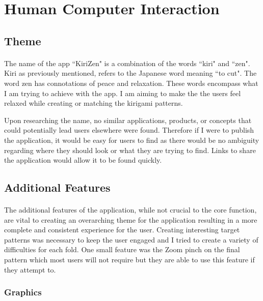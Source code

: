 \documentclass[11pt]{article}
\begin{document}
\clearpage
\newpage
\section{Human Computer Interaction}
    
    \subsection{Theme}
        
        \paragraph{}
        The name of the app ``KiriZen" is a combination of the words ``kiri" and ``zen". Kiri as previously mentioned, refers to the Japanese word meaning ``to cut". The word zen has connotations of peace and relaxation. These words encompass what I am trying to achieve with the app. I am aiming to make the the users feel relaxed while creating or matching the kirigami patterns.
        
        Upon researching the name, no similar applications, products, or concepts that could potentially lead users elsewhere were found. Therefore if I were to publish the application, it would be easy for users to find as there would be no ambiguity regarding where they should look or what they are trying to find. Links to share the application would allow it to be found quickly. 

        \subsection{Additional Features}
            \paragraph{}
        The additional features of the application, while not crucial to the core function, are vital to creating an overarching theme for the application resulting in a more complete and consistent experience for the user. Creating interesting target patterns was necessary to keep the user engaged and I tried to create a variety of difficulties for each fold. One small feature was the Zoom pinch on the final pattern which most users will not require but they are able to use this feature if they attempt to. 
        
         \subsubsection{Graphics}
\end{document}

